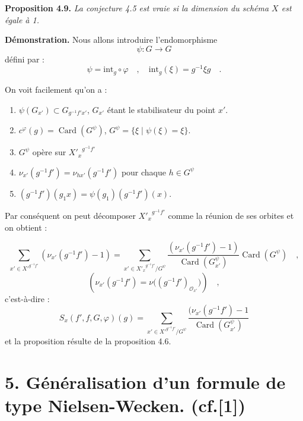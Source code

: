 \documentclass[11pt]{article}
\begin{document}
\medskip
\noindent
\textbf{Proposition 4.9.} \emph{La conjecture 4.5 est vraie si la dimension du schéma $X$ est égale à 1.}

\medskip

\noindent
\textbf{Démonstration.} Nous allons introduire l'endomorphisme
\[
\psi : G \longrightarrow G
\]
défini par :
\[
\psi = \mathrm{int}_g \circ \varphi \quad , \quad \mathrm{int}_g(\xi) = g^{-1}\xi g \quad .
\]

On voit facilement qu'on a :
\begin{enumerate}
\item[i)] $\psi(G_{x'}) \subset G_{g^{-1}f'x'}$, $G_{x'}$ étant le stabilisateur du point $x'$.
\item[ii)] $c^\varphi(g) = \operatorname{Card}(G^\psi)$, $G^\psi = \{ \xi \mid \psi(\xi) = \xi \}$.
\item[iii)] $G^\psi$ opère sur ${X'_x}^{g^{-1}f'}$
\item[i$\nu$)] $\nu_{x'}(g^{-1}f') = \nu_{hx'}(g^{-1}f')$ pour chaque $h \in G^\psi$
\item[$\nu$)] $(g^{-1}f')(g_1x) = \psi(g_1)(g^{-1}f')(x)$.
\end{enumerate}

Par conséquent on peut décomposer ${X'_x}^{g^{-1}f'}$ comme la réunion de ses orbites et on obtient :

\begin{equation}\tag{4.9.1}
\sum_{x' \in {X'}^{g^{-1}f'}} (\nu_{x'}(g^{-1}f') - 1) = \sum_{x' \in {X'_x}^{g^{-1}f'}/G^\psi} \frac{(\nu_{x'}(g^{-1}f') - 1)}{\operatorname{Card}(G^\psi_{x'})} \operatorname{Card}(G^\psi) \quad ,
\end{equation}
\[
(\nu_{x'}(g^{-1}f')=\nu\bigl((g^{-1}f')_{\mathcal{O}_{x'}}\bigr)) \quad ,
\]
c'est-à-dire :
\begin{equation}\tag{4.9.2}
S_x(f',f,G,\varphi)(g)=\sum_{x' \in {X'}^{g^{-1}f'}/G^\psi}
\frac{(\nu_{x'}(g^{-1}f')-1}{\operatorname{Card}(G^\psi_{x'})}
\end{equation}
et la proposition résulte de la proposition 4.6.


\section*{5. Généralisation d'un formule de type Nielsen-Wecken. {\normalfont (cf.[1])}}
\end{document}
